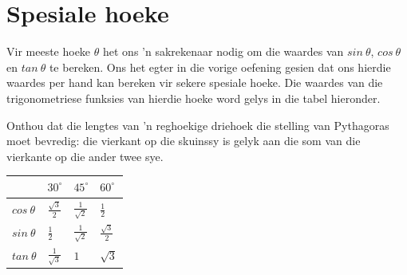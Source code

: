 \section{Spesiale hoeke}
Vir meeste hoeke $\theta $ het ons 'n sakrekenaar nodig om die waardes van $sin~\theta $, $cos~\theta $ en $tan~\theta $ te bereken. Ons het egter in die vorige oefening gesien dat ons hierdie waardes per hand kan bereken vir sekere spesiale hoeke. Die waardes van die trigonometriese funksies van hierdie hoeke word gelys in die tabel hieronder.\par
Onthou dat die lengtes van 'n reghoekige driehoek die stelling van Pythagoras moet bevredig: die vierkant op die skuinssy is gelyk aan die som van die vierkante op die ander twee sye.\par 
\begin{table}[H]
\begin{center}
\setlength{\extrarowheight}{2.5pt}

\begin{tabular}{|m{1.2cm}|l|l|l|}\hline
&

${30}^{\circ }$
&
${45}^{\circ }$
&
${60}^{\circ }$



\\ \hline
$cos~\theta $
 &
$\frac{\sqrt{3}}{2}$
&
$\frac{1}{\sqrt{2}}$
&
$\frac{1}{2}$

\\ \hline
$sin~\theta $
&

$\frac{1}{2} $
&
$\frac{1}{\sqrt{2}}$
&
$\frac{\sqrt{3}}{2}$

\\ \hline
$tan~\theta $
&

$\frac{1}{\sqrt{3}}$
&
$1$ &
$\sqrt{3}$



\\ \hline
\end{tabular}
\end{center}
\end{table}


